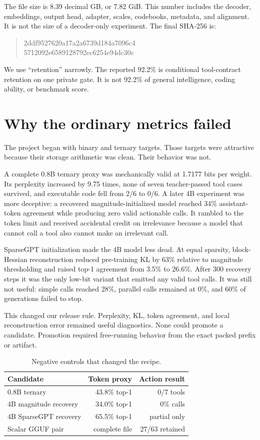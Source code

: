 \documentclass[10pt,twocolumn]{article}
\begin{document}
The file size is 8.39 decimal GB, or 7.82 GiB. This number includes the decoder, embeddings, output head, adapter, scales, codebooks, metadata, and alignment. It is not the size of a decoder-only experiment. The final SHA-256 is:

\begin{quote}\small\ttfamily
2ddf9527620a17a2a6739d184a7096c4\\
5712092e6589128792ec6254e94dc30c
\end{quote}

We use ``retention'' narrowly. The reported 92.2\% is conditional tool-contract retention on one private gate. It is not 92.2\% of general intelligence, coding ability, or benchmark score.

\section{Why the ordinary metrics failed}

The project began with binary and ternary targets. Those targets were attractive because their storage arithmetic was clean. Their behavior was not.

A complete 0.8B ternary proxy was mechanically valid at 1.7177 bits per weight. Its perplexity increased by 9.75 times, none of seven teacher-passed tool cases survived, and executable code fell from 2/6 to 0/6. A later 4B experiment was more deceptive: a recovered magnitude-initialized model reached 34\% assistant-token agreement while producing zero valid actionable calls. It rambled to the token limit and received accidental credit on irrelevance because a model that cannot call a tool also cannot make an irrelevant call.

SparseGPT initialization made the 4B model less dead. At equal sparsity, block-Hessian reconstruction reduced pre-training KL by 63\% relative to magnitude thresholding and raised top-1 agreement from 3.5\% to 26.6\%. After 300 recovery steps it was the only low-bit variant that emitted any valid tool calls. It was still not useful: simple calls reached 28\%, parallel calls remained at 0\%, and 60\% of generations failed to stop.

This changed our release rule. Perplexity, KL, token agreement, and local reconstruction error remained useful diagnostics. None could promote a candidate. Promotion required free-running behavior from the exact packed prefix or artifact.

\begin{table}[t]
\centering
\small
\caption{Negative controls that changed the recipe.}
\begin{tabularx}{\columnwidth}{@{}Xrr@{}}
\toprule
Candidate & Token proxy & Action result \\
\midrule
0.8B ternary & 43.8\% top-1 & 0/7 tools \\
4B magnitude recovery & 34.0\% top-1 & 0\% calls \\
4B SparseGPT recovery & 65.5\% top-1 & partial only \\
Scalar GGUF pair & complete file & 27/63 retained \\
\bottomrule
\end{tabularx}
\end{table}
\end{document}
